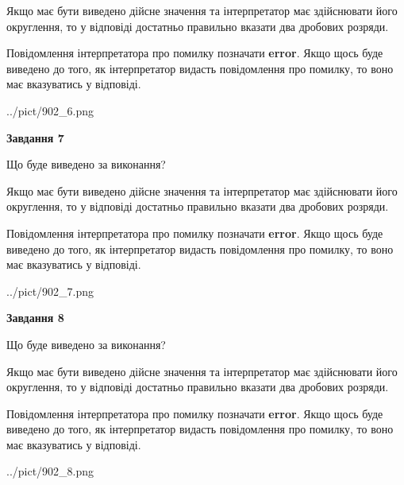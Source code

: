 \documentclass[12pt, ukrainian]{article}
\begin{document}
{\begin {Large}
Якщо має бути виведено дійсне значення та інтерпретатор має здійснювати його округлення, 
то у відповіді достатньо правильно вказати два дробових розряди.

Повідомлення інтерпретатора про помилку позначати \textbf{error}.
Якщо щось буде виведено до того, як інтерпретатор видасть повідомлення про помилку, 
то воно має вказуватись у відповіді. \par

\begin{center}
	{../pict/902_6.png}
\end{center}
\newpage

{\begin {center}\textbf{Завдання 7}\end {center}}\par
Що буде виведено за виконання? \par

Якщо має бути виведено дійсне значення та інтерпретатор має здійснювати його округлення, 
то у відповіді достатньо правильно вказати два дробових розряди.

Повідомлення інтерпретатора про помилку позначати \textbf{error}.
Якщо щось буде виведено до того, як інтерпретатор видасть повідомлення про помилку, 
то воно має вказуватись у відповіді. \par

\begin{center}
	{../pict/902_7.png}
\end{center}
\newpage

{\begin {center}\textbf{Завдання 8}\end {center}}\par
Що буде виведено за виконання? \par

Якщо має бути виведено дійсне значення та інтерпретатор має здійснювати його округлення, 
то у відповіді достатньо правильно вказати два дробових розряди.

Повідомлення інтерпретатора про помилку позначати \textbf{error}.
Якщо щось буде виведено до того, як інтерпретатор видасть повідомлення про помилку, 
то воно має вказуватись у відповіді. \par

\begin{center}
	{../pict/902_8.png}
\end{center}
\newpage


\end{Large}}
\end{document}
